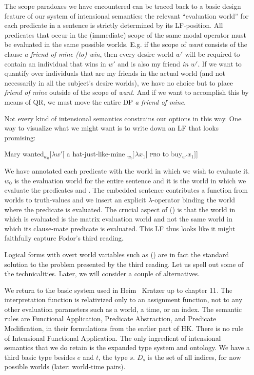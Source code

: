 The scope paradoxes we have encountered can be traced back to a basic design
feature of our system of intensional semantics: the relevant ``evaluation
world'' for each predicate in a sentence is strictly determined by its
LF-position. All predicates that occur in the (immediate) scope of the same
modal operator must be evaluated in the same possible worlds. E.g. if the scope
of \emph{want} consists of the clause \emph{a friend of mine (to) win}, then
every desire-world $w'$ will be required to contain an individual that wins in
$w'$ and is also my friend \emph{in $w'$}. If we want to quantify over
individuals that are my friends in the actual world (and not necessarily in all
the subject's desire worlds), we have no choice but to place \emph{friend of
  mine} outside of the scope of \emph{want}. And if we want to accomplish this
by means of QR, we must move the entire DP \emph{a friend of mine}.

Not every kind of intensional semantics constrains our options in this way. One
way to visualize what we might want is to write down an LF that looks promising:

\ex Mary wanted$_{w_0} [ \lambda w' [$ a hat-just-like-mine $_{w_0}] \lambda x_1 [$ \textsc{pro} to buy$_{w'} x_{1} ]]$ \xe

We have annotated each predicate with the world in which we wish to evaluate it.
$w_0$ is the evaluation world for the entire sentence and it is the world in
which we evaluate the predicates  and
. The embedded sentence contributes a function
from worlds to truth-values and we insert an explicit $\lambda$-operator binding
the world where the predicate  is evaluated. The crucial aspect
of (\lastx) is that the world in which  is
evaluated is the matrix evaluation world and not the same world in which its
clause-mate predicate  is evaluated. This LF thus looks like it
might faithfully capture Fodor's third reading.

Logical forms with overt world variables such as (\lastx) are in fact the
standard solution to the problem presented by the third reading. Let us spell
out some of the technicalities. Later, we will consider a couple of
alternatives.

We return to the basic system used in Heim \amp\ Kratzer up to chapter 11. The
interpretation function is relativized only to an assignment function, not to
any other evaluation parameters such as a world, a time, or an index. The
semantic rules are Functional Application, Predicate Abstraction, and Predicate
Modification, in their formulations from the earlier part of H\amp K. There is
no rule of Intensional Functional Application. The only ingredient of
intensional semantics that we do retain is the expanded type system and
ontology. We have a third basic type besides $e$ and $t$, the type $s$. $D_s$ is
the set of all indices, for now possible worlds (later: world-time pairs).

